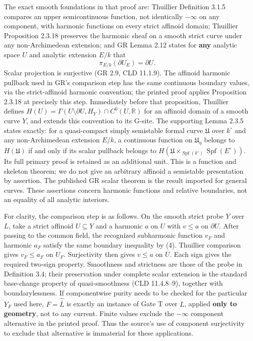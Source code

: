 \documentclass[
  11pt,
]{article}
\begin{document}
The exact smooth foundations in that proof are: Thuillier Definition
3.1.5 compares an upper semicontinuous function, not identically
\(-\infty\) on any component, with harmonic functions on every strict
affinoid domain; Thuillier Proposition 2.3.18 preserves the harmonic
sheaf on a smooth strict curve under any non-Archimedean extension; and
GR Lemma 2.12 states for \textbf{any} analytic space \(U\) and analytic
extension \(E/k\) that \[
                         \pi_{E/k}(\partial U_E)=\partial U.       \tag{4}
\] Scalar projection is surjective (GR 2.9, CLD 11.1.9). The affinoid
harmonic pullback used in GR's comparison step has the same continuous
boundary values, via the strict-affinoid harmonic convention; the
printed proof applies Proposition 2.3.18 at precisely this step.
Immediately before that proposition, Thuillier defines
\(H(U)=\Gamma(U\setminus\partial U,H_Y)\cap C^0(U,\mathbb R)\) for an
affinoid domain of a smooth curve \(Y\), and extends this convention to
its G-site. The supporting Lemma 2.3.5 states exactly: for a
quasi-compact simply semistable formal curve \(\mathfrak U\) over
\(k^\circ\) and any non-Archimedean extension \(E/k\), a continuous
function on \(\mathfrak U_\eta\) belongs to \(H(\mathfrak U)\) if and
only if its scalar pullback belongs to
\(H(\mathfrak U\times_{\operatorname{Spf}(k^\circ)}\operatorname{Spf}(E^\circ))\).
Its full primary proof is retained as an additional unit. This is a
function and skeleton theorem; we do not give an arbitrary affinoid a
semistable presentation by assertion. The published GR scalar theorem is
the result imported for general curves. These assertions concern
harmonic functions and relative boundaries, not an equality of all
analytic interiors.

For clarity, the comparison step is as follows. On the smooth strict
probe \(Y\) over \(L\), take a strict affinoid \(U\subseteq Y\) and a
harmonic \(a\) on \(U\) with \(v\leq a\) on \(\partial U\). After
passing to the common field, the recognized subharmonic function \(v_F\)
and harmonic \(a_F\) satisfy the same boundary inequality by (4).
Thuillier comparison gives \(v_F\leq a_F\) on \(U_F\). Surjectivity then
gives \(v\leq a\) on \(U\). Each sign gives the required two-sign
property. Smoothness and strictness are those of the probe in Definition
3.4; their preservation under complete scalar extension is the standard
base-change property of quasi-smoothness (CLD 11.4.8--9), together with
boundarylessness. If componentwise purity needs to be checked for the
particular \(Y_F\) used here, \(F=\widehat{\overline L}\) is exactly an
instance of Gate T over \(L\), applied \textbf{only to geometry}, not to
any current. Finite values exclude the \(-\infty\) component alternative
in the printed proof. Thus the source's use of component surjectivity to
exclude that alternative is immaterial for these applications.
\end{document}
